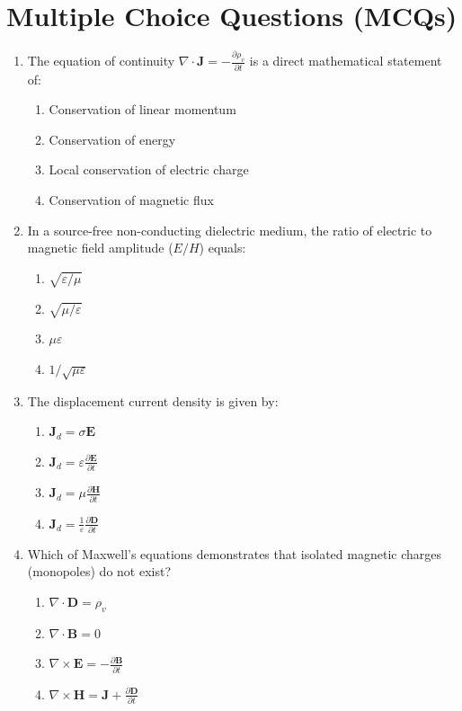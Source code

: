 \section{Multiple Choice Questions (MCQs)}

\begin{enumerate}
    \item The equation of continuity $\nabla \cdot \mathbf{J} = -\frac{\partial \rho_v}{\partial t}$ is a direct mathematical statement of:
    \begin{enumerate}
        \item Conservation of linear momentum
        \item Conservation of energy
        \item Local conservation of electric charge
        \item Conservation of magnetic flux
    \end{enumerate}
    
    \item In a source-free non-conducting dielectric medium, the ratio of electric to magnetic field amplitude ($E/H$) equals:
    \begin{enumerate}
        \item $\sqrt{\varepsilon/\mu}$
        \item $\sqrt{\mu/\varepsilon}$
        \item $\mu\varepsilon$
        \item $1/\sqrt{\mu\varepsilon}$
    \end{enumerate}
    
    \item The displacement current density is given by:
    \begin{enumerate}
        \item $\mathbf{J}_d = \sigma \mathbf{E}$
        \item $\mathbf{J}_d = \varepsilon \frac{\partial \mathbf{E}}{\partial t}$
        \item $\mathbf{J}_d = \mu \frac{\partial \mathbf{H}}{\partial t}$
        \item $\mathbf{J}_d = \frac{1}{\varepsilon}\frac{\partial \mathbf{D}}{\partial t}$
    \end{enumerate}
    
    \item Which of Maxwell's equations demonstrates that isolated magnetic charges (monopoles) do not exist?
    \begin{enumerate}
        \item $\nabla \cdot \mathbf{D} = \rho_v$
        \item $\nabla \cdot \mathbf{B} = 0$
        \item $\nabla \times \mathbf{E} = -\frac{\partial \mathbf{B}}{\partial t}$
        \item $\nabla \times \mathbf{H} = \mathbf{J} + \frac{\partial \mathbf{D}}{\partial t}$
    \end{enumerate}
    

\end{enumerate}
